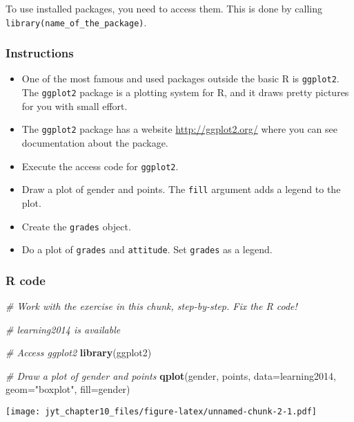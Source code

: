 \documentclass[]{article}
\newenvironment{Shaded}{\begin{snugshade}}{\end{snugshade}}
\newcommand{\CommentTok}[1]{\textcolor[rgb]{0.56,0.35,0.01}{\textit{#1}}}
\newcommand{\DataTypeTok}[1]{\textcolor[rgb]{0.13,0.29,0.53}{#1}}
\newcommand{\KeywordTok}[1]{\textcolor[rgb]{0.13,0.29,0.53}{\textbf{#1}}}
\newcommand{\NormalTok}[1]{#1}
\newcommand{\StringTok}[1]{\textcolor[rgb]{0.31,0.60,0.02}{#1}}
\providecommand{\tightlist}{%
  \setlength{\itemsep}{0pt}\setlength{\parskip}{0pt}}
\begin{document}
To use installed packages, you need to access them. This is done by
calling \texttt{library(name\_of\_the\_package)}.

\hypertarget{instructions}{%
\subsubsection{Instructions}\label{instructions}}

\begin{itemize}
\tightlist
\item
  One of the most famous and used packages outside the basic R is
  \texttt{ggplot2}. The \texttt{ggplot2} package is a plotting system
  for R, and it draws pretty pictures for you with small effort.
\item
  The \texttt{ggplot2} package has a website \url{http://ggplot2.org/}
  where you can see documentation about the package.
\item
  Execute the access code for \texttt{ggplot2}.
\item
  Draw a plot of gender and points. The \texttt{fill} argument adds a
  legend to the plot.
\item
  Create the \texttt{grades} object.
\item
  Do a plot of \texttt{grades} and \texttt{attitude}. Set
  \texttt{grades} as a legend.
\end{itemize}

\hypertarget{r-code}{%
\subsubsection{R code}\label{r-code}}

\begin{Shaded}
\begin{Highlighting}[]
\CommentTok{# Work with the exercise in this chunk, step-by-step. Fix the R code!}

\CommentTok{# learning2014 is available }

\CommentTok{# Access ggplot2}
\KeywordTok{library}\NormalTok{(ggplot2)}

\CommentTok{# Draw a plot of gender and points}
\KeywordTok{qplot}\NormalTok{(gender, points, }\DataTypeTok{data=}\NormalTok{learning2014, }\DataTypeTok{geom=}\StringTok{"boxplot"}\NormalTok{, }\DataTypeTok{fill=}\NormalTok{gender)}
\end{Highlighting}
\end{Shaded}

\texttt{[image: jyt\_chapter10\_files/figure-latex/unnamed-chunk-2-1.pdf]}
\end{document}
